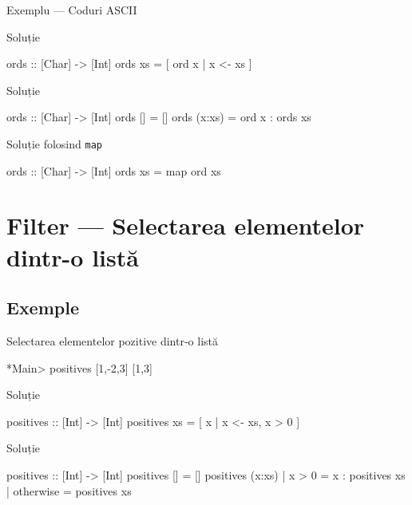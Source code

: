\documentclass[xcolor=pdftex,romanian,colorlinks]{beamer}
\begin{document}
\begin{frame}[fragile]
{Exemplu --- Coduri ASCII}
\begin{block}{Soluție }
\begin{asciihs}
ords :: [Char] -> [Int]
ords xs = [ ord x | x <- xs ]
\end{asciihs}
\end{block}
\begin{block}{Soluție }
\begin{asciihs}
ords :: [Char] -> [Int]
ords []     = []
ords (x:xs) = ord x : ords xs
\end{asciihs}
\end{block}
\begin{block}{Soluție folosind \lstinline$map$}
\begin{asciihs}
ords :: [Char] -> [Int]
ords xs = map ord xs
\end{asciihs}
\end{block}
\end{frame}

\section{Filter --- Selectarea elementelor dintr-o listă}
\subsection{Exemple}

\begin{frame}[fragile]{Selectarea elementelor pozitive dintr-o listă}
\begin{block}{}
\begin{asciihs}
*Main> positives [1,-2,3]
[1,3]
\end{asciihs}
\end{block}
\begin{block}{Soluție }
\begin{asciihs}
positives :: [Int] -> [Int]
positives xs = [ x | x <- xs, x > 0 ]
\end{asciihs}
\end{block}
\begin{block}{Soluție }
\begin{asciihs}
positives :: [Int] -> [Int]
positives []                 = []
positives (x:xs) | x > 0     = x : positives xs
                 | otherwise = positives xs
\end{asciihs}
\end{block}
\end{frame}
\end{document}
